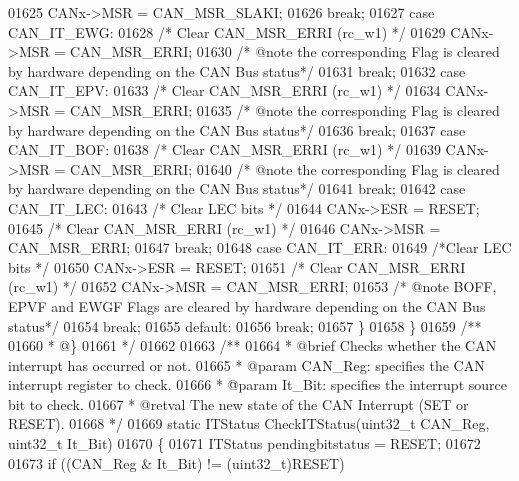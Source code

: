 \begin{DoxyCode}
01625       CANx->MSR = CAN_MSR_SLAKI;
01626       \textcolor{keywordflow}{break};
01627     \textcolor{keywordflow}{case} CAN_IT_EWG:
01628       \textcolor{comment}{/* Clear CAN\_MSR\_ERRI (rc\_w1) */}
01629       CANx->MSR = CAN_MSR_ERRI;
01630        \textcolor{comment}{/* @note the corresponding Flag is cleared by hardware depending on the CAN Bus status*/}
01631       \textcolor{keywordflow}{break};
01632     \textcolor{keywordflow}{case} CAN_IT_EPV:
01633       \textcolor{comment}{/* Clear CAN\_MSR\_ERRI (rc\_w1) */}
01634       CANx->MSR = CAN_MSR_ERRI;
01635        \textcolor{comment}{/* @note the corresponding Flag is cleared by hardware depending on the CAN Bus status*/}
01636       \textcolor{keywordflow}{break};
01637     \textcolor{keywordflow}{case} CAN_IT_BOF:
01638       \textcolor{comment}{/* Clear CAN\_MSR\_ERRI (rc\_w1) */}
01639       CANx->MSR = CAN_MSR_ERRI;
01640        \textcolor{comment}{/* @note the corresponding Flag is cleared by hardware depending on the CAN Bus status*/}
01641        \textcolor{keywordflow}{break};
01642     \textcolor{keywordflow}{case} CAN_IT_LEC:
01643       \textcolor{comment}{/*  Clear LEC bits */}
01644       CANx->ESR = RESET;
01645       \textcolor{comment}{/* Clear CAN\_MSR\_ERRI (rc\_w1) */}
01646       CANx->MSR = CAN_MSR_ERRI;
01647       \textcolor{keywordflow}{break};
01648     \textcolor{keywordflow}{case} CAN_IT_ERR:
01649       \textcolor{comment}{/*Clear LEC bits */}
01650       CANx->ESR = RESET;
01651       \textcolor{comment}{/* Clear CAN\_MSR\_ERRI (rc\_w1) */}
01652       CANx->MSR = CAN_MSR_ERRI;
01653        \textcolor{comment}{/* @note BOFF, EPVF and EWGF Flags are cleared by hardware depending on the CAN Bus status*/}
01654        \textcolor{keywordflow}{break};
01655     \textcolor{keywordflow}{default}:
01656        \textcolor{keywordflow}{break};
01657    \}
01658 \}
01659  \textcolor{comment}{/**}
01660 \textcolor{comment}{  * @\}}
01661 \textcolor{comment}{  */}
01662 
01663 \textcolor{comment}{/**}
01664 \textcolor{comment}{  * @brief  Checks whether the CAN interrupt has occurred or not.}
01665 \textcolor{comment}{  * @param  CAN\_Reg: specifies the CAN interrupt register to check.}
01666 \textcolor{comment}{  * @param  It\_Bit: specifies the interrupt source bit to check.}
01667 \textcolor{comment}{  * @retval The new state of the CAN Interrupt (SET or RESET).}
01668 \textcolor{comment}{  */}
01669 \textcolor{keyword}{static} ITStatus CheckITStatus(uint32\_t CAN\_Reg, uint32\_t It\_Bit)
01670 \{
01671   ITStatus pendingbitstatus = RESET;
01672 
01673   \textcolor{keywordflow}{if} ((CAN\_Reg & It\_Bit) != (uint32\_t)RESET)

\end{DoxyCode}
